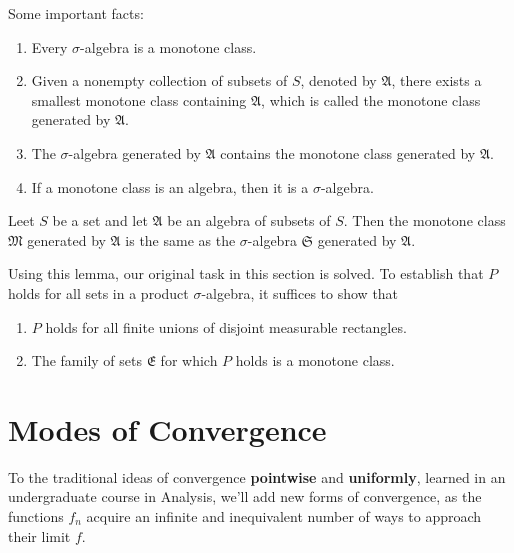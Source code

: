 Some important facts:
\begin{enumerate}
	\item Every $\sigma$-algebra is a monotone class.
	\item Given a nonempty collection of subsets of $S$, denoted by $\mathfrak{A}$, there exists a smallest monotone class containing $\mathfrak{A}$, which is called the monotone class generated by $\mathfrak{A}$.
	\item The $\sigma$-algebra generated by $\mathfrak{A}$ contains the monotone class generated by $\mathfrak{A}$.
	\item If a monotone class is an algebra, then it is a $\sigma$-algebra.
\end{enumerate}

\begin{lemma}
	Leet $S$ be a set and let $\mathfrak{A}$ be an algebra of subsets of $S$. Then the monotone class $\mathfrak{M}$ generated by $\mathfrak{A}$ is the same as the $\sigma$-algebra $\mathfrak{S}$ generated by $\mathfrak{A}$.
\end{lemma}

Using this lemma, our original task in this section is solved. To establish that $P$ holds for all sets in a product $\sigma$-algebra, it suffices to show that 
\begin{enumerate}
	\item $P$ holds for all finite unions of disjoint measurable rectangles.
	\item The family of sets $\mathfrak{E}$ for which $P$ holds is a monotone class.
\end{enumerate}

\section{Modes of Convergence}

To the traditional ideas of convergence \textbf{pointwise} and \textbf{uniformly}, learned in an undergraduate course in Analysis, we'll add new forms of convergence, as the functions $f_n$ acquire an infinite and inequivalent number of ways to approach their limit $f$. 

